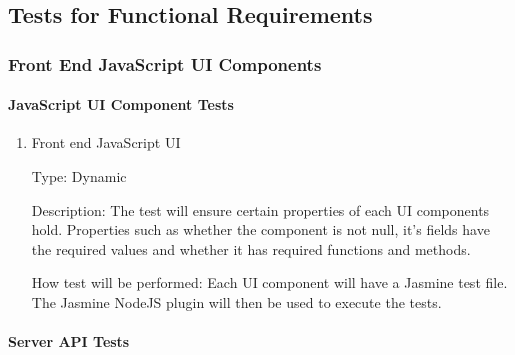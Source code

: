 \documentclass[12pt, titlepage]{article}
\begin{document}
\subsection{Tests for Functional Requirements}

\subsubsection{Front End JavaScript UI Components}
		
\paragraph{JavaScript UI Component Tests}

\begin{enumerate}

\item{Front end JavaScript UI\\}

Type: Dynamic
					
Description: The test will ensure certain properties of each UI components
hold.  Properties such as whether the component is not null, it's fields have
the required values and whether it has required functions and methods.

How test will be performed: Each UI component will have a Jasmine test file.
The Jasmine NodeJS plugin will then be used to execute the tests.
					
\end{enumerate}


\paragraph{Server API Tests}
\end{document}
